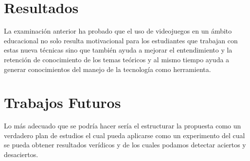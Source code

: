 \documentclass[conference, letterpaper]{IEEEtran}
\begin{document}
\section{Resultados}
La examinación anterior ha probado que el uso de videojuegos en un ámbito educacional no solo resulta motivacional para los estudiantes que trabajan con estas nueva técnicas sino que también ayuda a mejorar el entendimiento y la retención de conocimiento de los temas teóricos y al mismo tiempo ayuda a generar conocimientos del manejo de la tecnología como herramienta. 
\section{Trabajos Futuros}
Lo más adecuado que se podría hacer sería el estructurar la propuesta como un verdadero plan de estudios el cual pueda aplicarse como un experimento del cual se pueda obtener resultados verídicos y de los cuales podamos detectar aciertos y desaciertos. 




%
%

\end{document}
